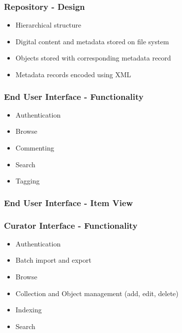 \documentclass[xcolor=dvitex,t,11pt]{beamer}
\begin{document}
\begin{frame}[fragile]
\frametitle{Repository - Design}
\begin{figure}
\centering
\framebox[\textwidth]{%

}
\end{figure}
\begin{itemize}
\item Hierarchical structure
\item Digital content and metadata stored on file system
\item Objects stored with corresponding metadata record
\item Metadata records encoded using XML
\end{itemize}
\begin{figure}
\end{figure}
\end{frame}

\begin{frame}[fragile]
\frametitle{End User Interface - Functionality}
\begin{figure}
\centering
\framebox[\textwidth]{%

}
\end{figure}
\begin{itemize}
\item Authentication
\item Browse
\item Commenting
\item Search
\item Tagging
\end{itemize}
\end{frame}

\begin{frame}[fragile]
\frametitle{End User Interface - Item View}
\begin{figure}
\centering
{}
\end{figure}
\end{frame}

\begin{frame}[fragile]
\frametitle{Curator Interface - Functionality}
\begin{figure}
\centering
\framebox[\textwidth]{%

}
\end{figure}
\begin{itemize}
\item Authentication
\item Batch import and export
\item Browse
\item Collection and Object management (add, edit, delete)
\item Indexing
\item Search
\end{itemize}
\end{frame}
\end{document}
